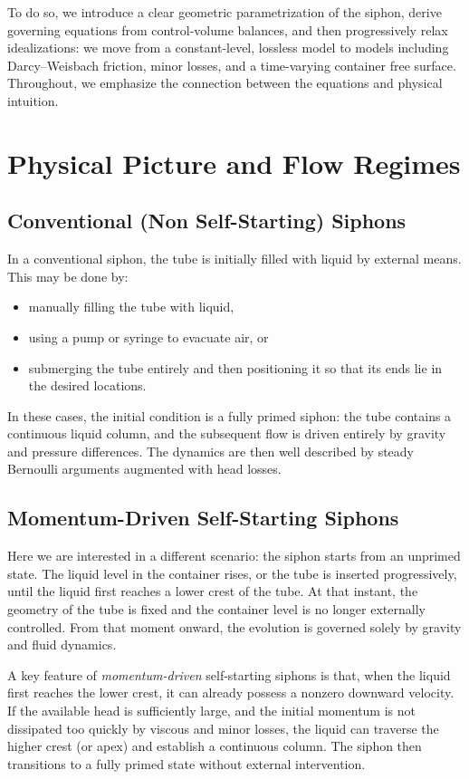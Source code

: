 \documentclass[11pt]{article}
\begin{document}
To do so, we introduce a clear geometric parametrization of the siphon, derive governing equations from control-volume balances, and then progressively relax idealizations: we move from a constant-level, lossless model to models including Darcy--Weisbach friction, minor losses, and a time-varying container free surface.
Throughout, we emphasize the connection between the equations and physical intuition.

\section{Physical Picture and Flow Regimes}
\label{sec:physical-picture}

\subsection{Conventional (Non Self-Starting) Siphons}

In a conventional siphon, the tube is initially filled with liquid by external means.
This may be done by:
\begin{itemize}
  \item manually filling the tube with liquid,
  \item using a pump or syringe to evacuate air, or
  \item submerging the tube entirely and then positioning it so that its ends lie in the desired locations.
\end{itemize}
In these cases, the initial condition is a fully primed siphon: the tube contains a continuous liquid column, and the subsequent flow is driven entirely by gravity and pressure differences.
The dynamics are then well described by steady Bernoulli arguments augmented with head losses.

\subsection{Momentum-Driven Self-Starting Siphons}

Here we are interested in a different scenario: the siphon starts from an unprimed state.
The liquid level in the container rises, or the tube is inserted progressively, until the liquid first reaches a lower crest of the tube.
At that instant, the geometry of the tube is fixed and the container level is no longer externally controlled.
From that moment onward, the evolution is governed solely by gravity and fluid dynamics.

A key feature of \emph{momentum-driven} self-starting siphons is that, when the liquid first reaches the lower crest, it can already possess a nonzero downward velocity.
If the available head is sufficiently large, and the initial momentum is not dissipated too quickly by viscous and minor losses, the liquid can traverse the higher crest (or apex) and establish a continuous column.
The siphon then transitions to a fully primed state without external intervention.
\end{document}
